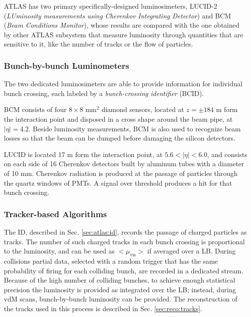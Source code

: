 ATLAS has two primary specifically-designed luminosimeters, LUCID-2 (\textit{LUminosity measurements using Cherenkov Integrating Detector}) and BCM (\textit{Beam Conditions Monitor}), whose results are compared with the one obtained by other ATLAS subsystem that measure luminosity through quantities that are sensitive to it, like the number of tracks or the flow of particles.

\subsubsection*{Bunch-by-bunch Luminometers}

The two dedicated luminosimeters are able to provide information for individual bunch crossing, each labeled by a \textit{bunch-crossing identifier} (BCID).

BCM consists of four $8 \times 8$ mm$^2$ diamond sensors, located at $z= \pm 184$ m form the interaction point and disposed in a cross shape around the beam pipe, at $|\eta| = 4.2$. Beside luminosity measurements, BCM is also used to recognize beam losses so that the beam can be dumped before damaging the silicon detectors. 

LUCID is located 17 m form the interaction point, at $5.6 < |\eta| < 6.0$, and consists on each side of 16 Cherenkov detectors built by aluminum tubes with a diameter of 10 mm. Cherenkov radiation is produced at the passage of particles through the quartz windows of PMTs. A signal over threshold produces a hit for that bunch crossing.


\subsubsection*{Tracker-based Algorithms}

The ID, described in Sec. \ref{sec:atlas:id}, records the passage of charged particles as tracks. The number of such charged tracks in each bunch crossing is proportional to the luminosity, and can be used as $<\mu_\mathrm{vis}>$ if averaged over a LB. 
During collisions partial data, selected with a random trigger that has the same probability of firing for each colliding bunch, are recorded in a dedicated stream. Because of the high number of colliding bunches, to achieve enough statistical precision the luminosity is provided as integrated over the LB; instead, during vdM scans, bunch-by-bunch luminosity can be provided. 
The reconstruction of the tracks used in this process is described in Sec. \ref{sec:reco:tracks}.

